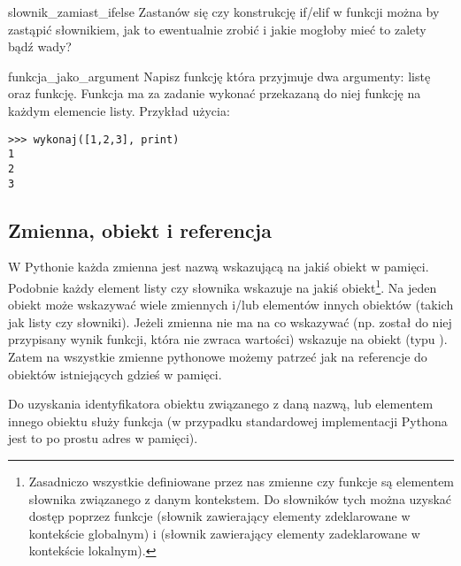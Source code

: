 \documentclass{pdfBooklets}
\begin{document}
\begin{Zadanie}{}{slownik_zamiast_ifelse}
Zastanów się czy konstrukcję if/elif w funkcji  można by zastąpić słownikiem, jak to ewentualnie zrobić i jakie mogłoby mieć to zalety bądź wady?
\end{Zadanie}

\begin{Zadanie}{}{funkcja_jako_argument}
Napisz funkcję która przyjmuje dwa argumenty: listę oraz funkcję. Funkcja ma za zadanie wykonać przekazaną do niej funkcję na każdym elemencie listy. Przykład użycia:
\begin{Verbatim}
>>> wykonaj([1,2,3], print)
1
2
3
\end{Verbatim}
\end{Zadanie}

\subsection{Zmienna, obiekt i referencja {\Symbola 🤔}}

W Pythonie każda zmienna jest nazwą wskazującą na jakiś obiekt w pamięci. Podobnie każdy element listy czy słownika wskazuje na jakiś obiekt\footnote{
Zasadniczo wszystkie definiowane przez nas zmienne czy funkcje są elementem słownika związanego z danym kontekstem.
Do słowników tych można uzyskać dostęp poprzez funkcje  (słownik zawierający elementy zdeklarowane w kontekście globalnym) i
 (słownik zawierający elementy zadeklarowane w kontekście lokalnym).
}.
Na jeden obiekt może wskazywać wiele zmiennych i/lub elementów innych obiektów (takich jak listy czy słowniki).
Jeżeli zmienna nie ma na co wskazywać (np. został do niej przypisany wynik funkcji, która nie zwraca wartości) wskazuje na obiekt  (typu ).
Zatem na wszystkie zmienne pythonowe możemy patrzeć jak na referencje do obiektów istniejących gdzieś w pamięci.

Do uzyskania identyfikatora obiektu związanego z daną nazwą, lub elementem innego obiektu służy funkcja  (w przypadku standardowej implementacji Pythona jest to po prostu adres w pamięci).
\end{document}
